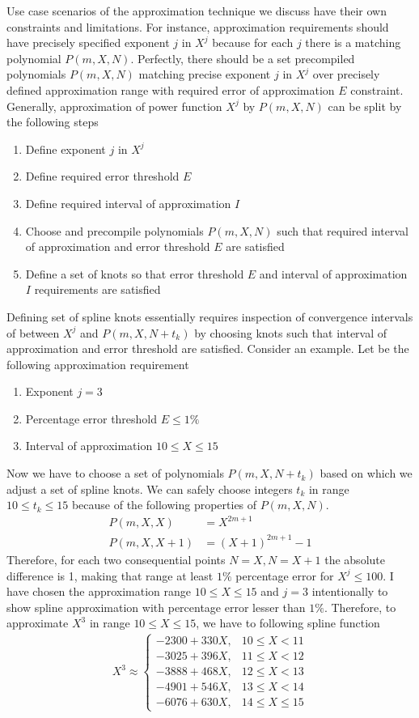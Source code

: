 ﻿Use case scenarios of the approximation technique we discuss have their own constraints and limitations.
For instance, approximation requirements should have precisely specified exponent $j$ in $X^j$ because
for each $j$ there is a matching polynomial $P(m,X,N)$.
Perfectly, there should be a set precompiled polynomials $P(m,X,N)$ matching precise exponent $j$ in $X^j$ over
precisely defined approximation range with required error of approximation $E$ constraint.
Generally, approximation of power function $X^j$ by $P(m,X,N)$ can be split by the following steps
\begin{enumerate}
    \item Define exponent $j$ in $X^j$
    \item Define required error threshold $E$
    \item Define required interval of approximation $I$
    \item Choose and precompile polynomials $P(m,X,N)$
    such that required interval of approximation and error threshold $E$ are satisfied
    \item Define a set of knots so that error threshold $E$ and interval of approximation $I$ requirements are satisfied
\end{enumerate}
Defining set of spline knots essentially requires inspection of convergence intervals of between $X^j$ and $P(m,X,N+t_k)$
by choosing knots such that interval of approximation and error threshold are satisfied.
Consider an example.
Let be the following approximation requirement
\begin{enumerate}
    \item Exponent $j=3$
    \item Percentage error threshold $E\leq 1\%$
    \item Interval of approximation $10 \leq X \leq 15$
\end{enumerate}
Now we have to choose a set of polynomials $P(m, X, N+t_k)$ based on which we adjust a set of spline knots.
We can safely choose integers $t_k$ in range $10 \leq t_k \leq 15$ because
of the following properties of $P(m,X, N)$.
\begin{align*}
    P(m,X, X) &= X^{2m+1} \\
    P(m,X, X+1) &= (X+1)^{2m+1} - 1
\end{align*}
Therefore, for each two consequential points $N=X, N=X+1$ the absolute difference is 1, making that range
at least $1\%$ percentage error for $X^j \leq 100$.
I have chosen the approximation range $10 \leq X \leq 15$ and $j=3$ intentionally to show spline approximation with
percentage error lesser than $1\%$.
Therefore, to approximate $X^3$ in range $10 \leq X \leq 15$, we have to following spline function
\begin{align*}
    X^3 \approx
    \begin{cases}
        -2300 + 330X, & 10 \leq X < 11 \\
        -3025 + 396X, & 11 \leq X < 12 \\
        -3888 + 468X, & 12 \leq X < 13 \\
        -4901 + 546X, & 13 \leq X < 14 \\
        -6076 + 630X, & 14 \leq X \leq 15
    \end{cases}
\end{align*}
